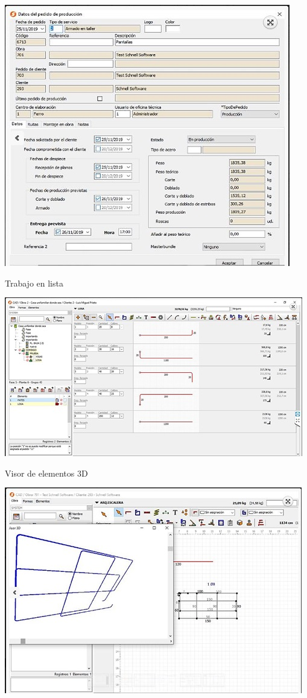 \documentclass[10pt,a4paper]{article}
\begin{document}
\begin{enumerate}
\includegraphics[scale=1]{GRAPHICO PRO 2.JPG}

\begin{center}
Trabajo en lista
\end{center}

\includegraphics[scale=1]{GRAPHICO PRO - Trabajo en lista.JPG}

\begin{center}
Visor de elementos 3D
\end{center}

\includegraphics[scale=1]{GRAPHICO PRO - Visor de elementos 3D.JPG}


\end{enumerate}
\end{document}
